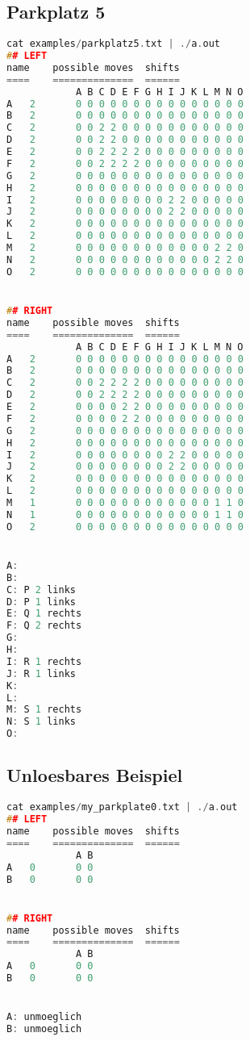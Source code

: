 \documentclass[a4paper,10pt,ngerman]{scrartcl}
\begin{document}
\subsection*{Parkplatz 5}
\begin{lstlisting}[language=C++]
cat examples/parkplatz5.txt | ./a.out
## LEFT
name	possible moves	shifts
====	==============	======
			A B C D E F G H I J K L M N O
A	2		0 0 0 0 0 0 0 0 0 0 0 0 0 0 0
B	2		0 0 0 0 0 0 0 0 0 0 0 0 0 0 0
C	2		0 0 2 2 0 0 0 0 0 0 0 0 0 0 0
D	2		0 0 2 2 0 0 0 0 0 0 0 0 0 0 0
E	2		0 0 2 2 2 2 0 0 0 0 0 0 0 0 0
F	2		0 0 2 2 2 2 0 0 0 0 0 0 0 0 0
G	2		0 0 0 0 0 0 0 0 0 0 0 0 0 0 0
H	2		0 0 0 0 0 0 0 0 0 0 0 0 0 0 0
I	2		0 0 0 0 0 0 0 0 2 2 0 0 0 0 0
J	2		0 0 0 0 0 0 0 0 2 2 0 0 0 0 0
K	2		0 0 0 0 0 0 0 0 0 0 0 0 0 0 0
L	2		0 0 0 0 0 0 0 0 0 0 0 0 0 0 0
M	2		0 0 0 0 0 0 0 0 0 0 0 0 2 2 0
N	2		0 0 0 0 0 0 0 0 0 0 0 0 2 2 0
O	2		0 0 0 0 0 0 0 0 0 0 0 0 0 0 0


## RIGHT
name	possible moves	shifts
====	==============	======
			A B C D E F G H I J K L M N O
A	2		0 0 0 0 0 0 0 0 0 0 0 0 0 0 0
B	2		0 0 0 0 0 0 0 0 0 0 0 0 0 0 0
C	2		0 0 2 2 2 2 0 0 0 0 0 0 0 0 0
D	2		0 0 2 2 2 2 0 0 0 0 0 0 0 0 0
E	2		0 0 0 0 2 2 0 0 0 0 0 0 0 0 0
F	2		0 0 0 0 2 2 0 0 0 0 0 0 0 0 0
G	2		0 0 0 0 0 0 0 0 0 0 0 0 0 0 0
H	2		0 0 0 0 0 0 0 0 0 0 0 0 0 0 0
I	2		0 0 0 0 0 0 0 0 2 2 0 0 0 0 0
J	2		0 0 0 0 0 0 0 0 2 2 0 0 0 0 0
K	2		0 0 0 0 0 0 0 0 0 0 0 0 0 0 0
L	2		0 0 0 0 0 0 0 0 0 0 0 0 0 0 0
M	1		0 0 0 0 0 0 0 0 0 0 0 0 1 1 0
N	1		0 0 0 0 0 0 0 0 0 0 0 0 1 1 0
O	2		0 0 0 0 0 0 0 0 0 0 0 0 0 0 0


A:
B:
C: P 2 links
D: P 1 links
E: Q 1 rechts
F: Q 2 rechts
G:
H:
I: R 1 rechts
J: R 1 links
K:
L:
M: S 1 rechts
N: S 1 links
O:
\end{lstlisting}

\subsection*{Unloesbares Beispiel}
\begin{lstlisting}[language=C++]
cat examples/my_parkplate0.txt | ./a.out
## LEFT
name	possible moves	shifts
====	==============	======
			A B
A	0		0 0
B	0		0 0


## RIGHT
name	possible moves	shifts
====	==============	======
			A B
A	0		0 0
B	0		0 0


A: unmoeglich
B: unmoeglich
\end{lstlisting}
\end{document}
